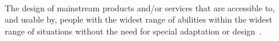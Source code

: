 \begin{description}
  \item[] \hfill \\
  \begin{mdframed}[hidealllines=true,backgroundcolor=gray!20]
  The design of mainstream products and/or services that are accessible to, and
  usable by, people with the widest range of abilities within the widest range
  of situations without the need for special adaptation or design~\citep{design_2005}.
  \end{mdframed}
\end{description}